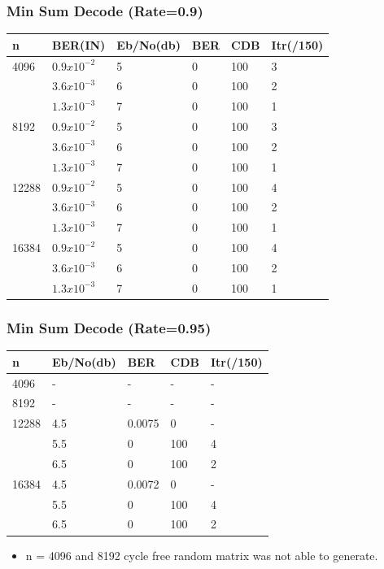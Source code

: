 \documentclass[xcolor=dvipsname]
{beamer}
\begin{document}
\begin{frame}[t] 
\frametitle{Min Sum Decode (Rate=0.9)}

\begin{table}[]
\centering
\begin{tabular}{|l|l|l|l|l|l|}
\hline
n     & BER(IN) & Eb/No(db) & BER & CDB & Itr(/150) \\ \hline
4096  & $0.9x10^{-2}$ & 5     & 0   & 100 & 3         \\ 
      & $3.6x10^{-3}$ & 6     & 0   & 100 & 2         \\ 
      & $1.3x10^{-3}$ & 7     & 0   & 100 & 1         \\ \hline
8192  & $0.9x10^{-2}$ & 5     & 0   & 100 & 3         \\ 
      & $3.6x10^{-3}$ & 6     & 0   & 100 & 2         \\ 
      & $1.3x10^{-3}$ & 7     & 0   & 100 & 1         \\ \hline
12288 & $0.9x10^{-2}$ & 5     & 0   & 100 & 4         \\ 
      & $3.6x10^{-3}$ & 6     & 0   & 100 & 2         \\ 
      & $1.3x10^{-3}$ & 7     & 0   & 100 & 1         \\ \hline
16384 & $0.9x10^{-2}$ & 5     & 0   & 100 & 4         \\ 
      & $3.6x10^{-3}$ & 6     & 0   & 100 & 2         \\ 
      & $1.3x10^{-3}$ & 7     & 0   & 100 & 1         \\ \hline
\end{tabular}
\end{table}

\end{frame}


\begin{frame}[t] 
\frametitle{Min Sum Decode (Rate=0.95)}

\begin{table}[]
\centering
\begin{tabular}{|l|l|l|l|l|}
\hline
n     & Eb/No(db) & BER    & CDB & Itr(/150) \\ \hline
4096  & -     & -      & -   & -         \\ \hline
8192  & -     & -      & -   & -         \\ \hline
12288 & 4.5   & 0.0075 & 0   & -         \\ 
      & 5.5   & 0      & 100 & 4         \\ 
      & 6.5   & 0      & 100 & 2         \\ \hline
16384 & 4.5   & 0.0072 & 0   & -         \\ 
      & 5.5   & 0      & 100 & 4         \\ 
      & 6.5   & 0      & 100 & 2         \\ \hline
\end{tabular}
\end{table}
\begin{itemize}
\item n = 4096 and 8192 cycle free random matrix was not able to generate. 
\end{itemize}
\end{frame}
\end{document}
